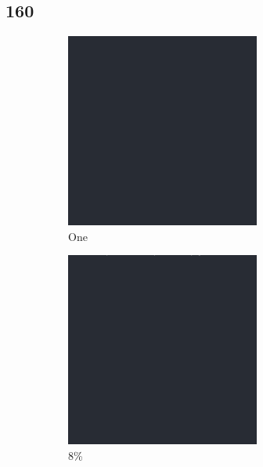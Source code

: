 \documentclass[12pt, fleqn]{report}                             %
\theoremstyle{break}                                            %
\begin{document}
        \subsection{160}
        \begin{figure}[h!]
          \centering
          \begin{subfigure}[b]{0.4\linewidth}
            \includegraphics[width=0.7\textwidth]{Images/160/a.png}
            \caption{One}
          \end{subfigure}
          \begin{subfigure}[b]{0.4\linewidth}
            \includegraphics[width=0.7\textwidth]{Images/160/b.png}
            \caption{8\%}
          \end{subfigure}
          \begin{subfigure}[b]{0.4\linewidth}

\end{subfigure}
\end{figure}
\end{document}
